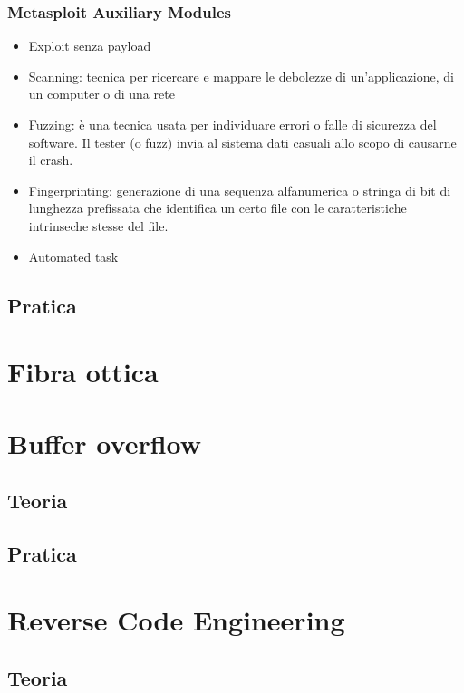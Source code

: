 \documentclass{article}
\begin{document}
\subsubsection{Metasploit Auxiliary Modules}
\begin{itemize}
    \item Exploit senza payload
    \item Scanning: tecnica per ricercare e mappare le debolezze di un'applicazione, di un computer o 
    di una rete
    \item Fuzzing: è una tecnica usata per individuare errori o falle di sicurezza del software. Il tester
     (o fuzz) invia al sistema dati casuali allo scopo di causarne il crash.
     \item Fingerprinting: generazione di una sequenza alfanumerica o stringa di bit di lunghezza prefissata 
     che identifica un certo file con le caratteristiche intrinseche stesse del file.
     \item Automated task
\end{itemize}



\subsection{Pratica}

\section{Fibra ottica}

\section{Buffer overflow}
\subsection{Teoria}

\subsection{Pratica}

\section{Reverse Code Engineering}

\subsection{Teoria}
\end{document}
